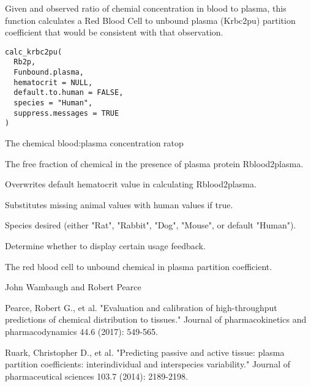 \documentclass[a4paper]{book}
\begin{document}
%
\begin{Description}\relax
Given and observed ratio of chemial concentration in blood to plasma, this
function calculates a Red Blood Cell to unbound plasma (Krbc2pu) partition
coefficient that would be consistent with that observation.
\end{Description}
%
\begin{Usage}
\begin{verbatim}
calc_krbc2pu(
  Rb2p,
  Funbound.plasma,
  hematocrit = NULL,
  default.to.human = FALSE,
  species = "Human",
  suppress.messages = TRUE
)
\end{verbatim}
\end{Usage}
%
\begin{Arguments}
\begin{ldescription}
\item[\code{Rb2p}] The chemical blood:plasma concentration ratop

\item[\code{Funbound.plasma}] The free fraction of chemical in the presence of 
plasma protein
Rblood2plasma.

\item[\code{hematocrit}] Overwrites default hematocrit value in calculating
Rblood2plasma.

\item[\code{default.to.human}] Substitutes missing animal values with human values
if true.

\item[\code{species}] Species desired (either "Rat", "Rabbit", "Dog", "Mouse", or
default "Human").

\item[\code{suppress.messages}] Determine whether to display certain usage
feedback.
\end{ldescription}
\end{Arguments}
%
\begin{Value}
The red blood cell to unbound chemical in plasma partition coefficient.
\end{Value}
%
\begin{Author}\relax
John Wambaugh and Robert Pearce
\end{Author}
%
\begin{References}\relax
Pearce, Robert G., et al. "Evaluation and calibration of high-throughput 
predictions of chemical distribution to tissues." Journal of 
pharmacokinetics and pharmacodynamics 44.6 (2017): 549-565.

Ruark, Christopher D., et al. "Predicting passive and active tissue: plasma 
partition coefficients: interindividual and interspecies variability." 
Journal of pharmaceutical sciences 103.7 (2014): 2189-2198.
\end{References}
\end{document}
